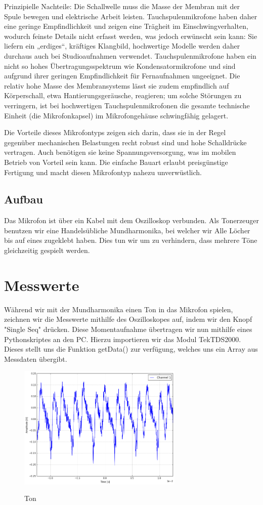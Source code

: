 \documentclass[TGAI_Laborbericht.tex]{subfiles}
\begin{document}
Prinzipielle Nachteile: Die Schallwelle muss die Masse der Membran mit der Spule bewegen und elektrische Arbeit leisten. Tauchspulenmikrofone haben daher eine geringe Empfindlichkeit und zeigen eine Trägheit im Einschwingverhalten, wodurch feinste Details nicht erfasst werden, was jedoch erwünscht sein kann: Sie liefern ein „erdiges“, kräftiges Klangbild, hochwertige Modelle werden daher durchaus auch bei Studioaufnahmen verwendet. Tauchspulenmikrofone haben ein nicht so hohes Übertragungsspektrum wie Kondensatormikrofone und sind aufgrund ihrer geringen Empfindlichkeit für Fernaufnahmen ungeeignet. Die relativ hohe Masse des Membransystems lässt sie zudem empfindlich auf Körperschall, etwa Hantierungsgeräusche, reagieren; um solche Störungen zu verringern, ist bei hochwertigen Tauchspulenmikrofonen die gesamte technische Einheit (die Mikrofonkapsel) im Mikrofongehäuse schwingfähig gelagert.

Die Vorteile dieses Mikrofontyps zeigen sich darin, dass sie in der Regel gegenüber mechanischen Belastungen recht robust sind und hohe Schalldrücke vertragen. Auch benötigen sie keine Spannungsversorgung, was im mobilen Betrieb von Vorteil sein kann. Die einfache Bauart erlaubt preisgünstige Fertigung und macht diesen Mikrofontyp nahezu unverwüstlich.


\subsection{Aufbau}
Das Mikrofon ist über ein Kabel mit dem Oszilloskop verbunden. Als Tonerzeuger benutzen wir eine Handelsübliche Mundharmonika, bei welcher wir Alle Löcher bis auf eines zugeklebt haben. Dies tun wir um zu verhindern, dass mehrere Töne gleichzeitig gespielt werden.

\section{Messwerte}
\label{chap:VERSUCH_1_MESSWERTE}
Während wir mit der Mundharmonika einen Ton in das Mikrofon spielen, zeichnen wir die Messwerte mithilfe des Oszilloskopes auf, indem wir den Knopf "Single Seq" drücken. Diese Momentaufnahme übertragen wir nun mithilfe eines Pythonskriptes an den PC. Hierzu importieren wir das Modul TekTDS2000. Dieses stellt uns die Funktion getData() zur verfügung, welches uns ein Array aus Messdaten übergibt.

\begin{figure}[H]
	\includegraphics[width=0.7\textwidth]{media/V1.png}
	\label{fig:Ton}
	\caption{Ton}
\end{figure}
\end{document}
